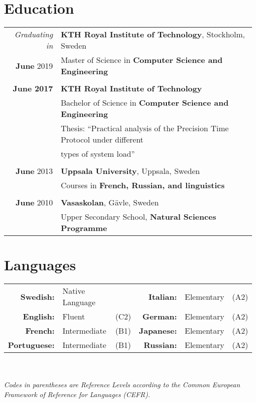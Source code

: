 \documentclass[a4paper,10pt]{article}
\begin{document}
\section{Education}
\begin{tabular}{r|l}
\emph{Graduating in} & \textbf{KTH Royal Institute of Technology}, Stockholm, Sweden\\	
\textbf{June} 2019 & Master of Science in \textbf{Computer Science and Engineering}\\&\\
\textbf{June 2017} & \textbf{KTH Royal Institute of Technology} \\& Bachelor of Science in \textbf{Computer Science and Engineering}\\ &Thesis: ``Practical analysis of the Precision Time Protocol under different \\& types of system load''\\ \\
\textbf{June} 2013& \textbf{Uppsala University}, Uppsala, Sweden\\& Courses in \textbf{French, Russian, and linguistics}\\&\\
\textbf{June} 2010& \textbf{Vasaskolan}, Gävle, Sweden \\& Upper Secondary School, \textbf{Natural Sciences Programme}
\end{tabular}

\section{Languages}
\begin{tabular}{rll|rll}
\textbf{Swedish:}&Native Language&&
\textbf{Italian:}&Elementary&(A2)\\
\textbf{English:}&Fluent&(C2)&
\textbf{German:}&Elementary&(A2)\\
\textbf{French:}&Intermediate&(B1)&
\textbf{Japanese:}&Elementary&(A2)\\
\textbf{Portuguese:}&Intermediate&(B1)&
\textbf{Russian:}&Elementary&(A2)
\end{tabular}
\\ \\
\textit{Codes in parentheses are Reference Levels according to the Common European Framework of Reference for Languages (CEFR).}
\end{document}

